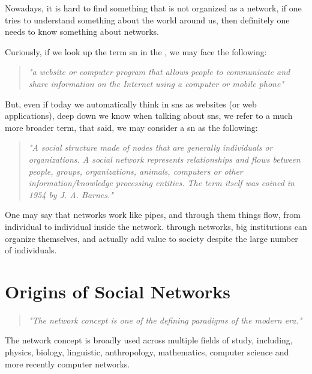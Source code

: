 
Nowadays, it is hard to find something that is not organized as a network, if one tries to understand something about the world around us, then definitely one needs to know something about networks.

Curiously, if we look up the term \gls{sn} in the \citep{dictionary2002cambridge}, we may face the following:

\begin{quote}
\textit{"a website or computer program that allows people to communicate and share information on the Internet using a computer or mobile phone"}
\end{quote}

But, even if today we automatically think in \glspl{sn} as websites (or web applications), deep down we know when talking about \glspl{sn}, we refer to a much more broader term, that said, we may consider a \gls{sn} as the following:

\begin{quote}
\textit{"A social structure made of nodes that are generally individuals or organizations. A social network represents relationships and flows between people, groups, organizations, animals, computers or other information/knowledge processing entities. The term itself was coined in 1954 by J. A. Barnes."}
\citep{webopediasn}
\end{quote}

One may say that networks work like pipes, and through them things flow, from individual to individual inside the network. through networks, big institutions can organize themselves, and actually add value to society despite the large number of individuals.


\section{Origins of Social Networks}

\begin{quote}
\textit{"The network concept is one of the defining paradigms of the modern era."}
\citep{kilduff2003social}
\end{quote}

The network concept is broadly used across multiple fields of study, including, physics, biology, linguistic, anthropology, mathematics, computer science and more recently computer networks.\\

